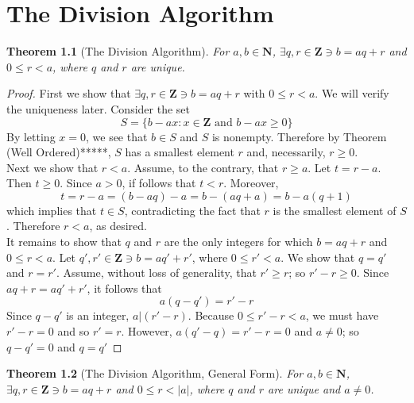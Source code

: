 \documentclass[10pt]{report}
\newtheorem{thm1}{Theorem}[chapter]
\begin{document}
\chapter{The Division Algorithm}
\begin{thm1}[The Division Algorithm]
For $a,b\in \textbf{N}$, $\exists q,r\in \textbf{Z}\ni b=aq+r$ and $0\leq r< a$, where $q$ and $r$ are unique.
\end{thm1}
\begin{proof}
First we show that $\exists q,r\in \textbf{Z}\ni b=aq+r$ with $0\leq r<a$. We will verify the uniqueness later. Consider the set
$$S=\{b-ax:x\in \textbf{Z} \text{ and } b-ax\geq 0\}$$
By letting $x=0$, we see that $b\in S$ and $S$ is nonempty. Therefore by Theorem (Well Ordered)*****, $S$ has a smallest element $r$ and, necessarily, $r\geq 0$.\\
Next we show that $r<a$. Assume, to the contrary, that $r\geq a$. Let $t=r -a$. Then $t\geq 0$. Since $a>0$, if follows that $t<r$. Moreover,
$$t=r-a=(b-aq)-a=b-(aq+a)=b-a(q+1)$$
which implies that $t\in S$, contradicting the fact that $r$ is the smallest element of $S$. Therefore $r<a$, as desired.\\
It remains to show that $q$ and $r$ are the only integers for which $b=aq+r$ and $0\leq r<a$. Let $q', r'\in \textbf{Z}\ni b=aq'+r'$, where $0\leq r'<a$. We show that $q=q'$ and $r=r'$. Assume, without loss of generality, that $r'\geq r$; so $r'-r\geq 0$. Since $aq+r=aq'+r'$, it follows that
$$a(q-q')=r'-r$$
Since $q-q'$ is an integer, $a|(r'-r)$. Because $0\leq r'-r<a$, we must have $r'-r=0$ and so $r'=r$. However, $a(q'-q)=r'-r=0$ and $a\neq 0$; so $q-q'=0$ and $q=q'$
\end{proof}
\begin{thm1}[The Division Algorithm, General Form]
For $a,b\in \textbf{N}$, $\exists q,r\in \textbf{Z}\ni b=aq+r$ and $0\leq r< |a|$, where $q$ and $r$ are unique and $a\neq 0$.
\end{thm1}
\end{document}
